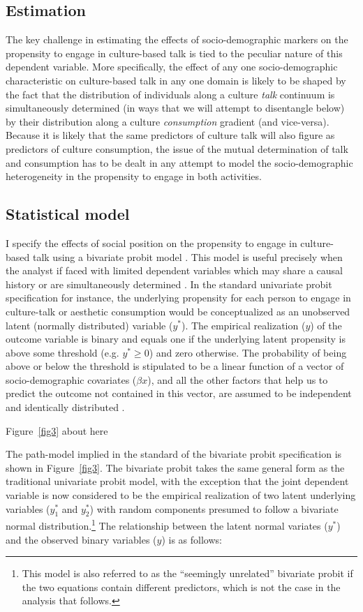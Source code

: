 \documentclass[11pt]{article}
\begin{document}
\subsection{Estimation}
The key challenge in estimating the effects of socio-demographic markers on the propensity to engage in culture-based talk is tied to the peculiar nature of this dependent variable.  More specifically, the effect of any one socio-demographic characteristic on culture-based talk in any one domain is likely to be shaped by the fact that the distribution of individuals along a culture \emph{talk} continuum is simultaneously determined (in ways that we will attempt to disentangle below) by their distribution along a culture \emph{consumption} gradient (and vice-versa). Because it is likely that the same predictors of culture talk will also figure as predictors of culture consumption, the issue of the mutual determination of talk and consumption has to be dealt in any attempt to model the socio-demographic heterogeneity in the propensity to engage in both activities.  

\subsection{Statistical model}
I specify the effects of social position on the propensity to engage in culture-based talk using a bivariate probit model \citep{ greene98}. This model is useful precisely when the analyst if faced with limited dependent variables which may share a causal history or are simultaneously determined \citep{calhoun89}.  In the standard univariate probit specification for instance, the underlying propensity for each person to engage in culture-talk or aesthetic consumption would be conceptualized as an unobserved latent (normally distributed) variable ($y^{*}$).  The empirical realization ($y$) of the outcome variable is binary and equals one if the underlying latent propensity is above some threshold (e.g. $y^{*} \geq 0$) and zero otherwise. The probability of being above or below the threshold is stipulated to be a linear function of a vector of socio-demographic covariates ($\beta x$), and all the other factors that help us to predict the outcome not contained in this vector, are assumed to be independent and identically distributed \citep{long_freese06}.

\begin{center}
	Figure~\ref{fig3} about here
\end{center}

The path-model implied in the standard of the bivariate probit specification is shown in Figure~\ref{fig3}. The bivariate probit takes the same general form as the traditional univariate probit model, with the exception that the joint dependent variable is now considered to be the empirical realization of two latent underlying variables ($y^{*}_{1}$ and $y^{*}_{2}$) with random components presumed to follow a bivariate normal distribution.\footnote{This model is also referred to as the ``seemingly unrelated'' bivariate probit if the two equations contain different predictors, which is not the case in the analysis that follows.} The relationship between the latent normal variates ($y^{*}$) and the observed binary variables ($y$) is as follows:
\end{document}
